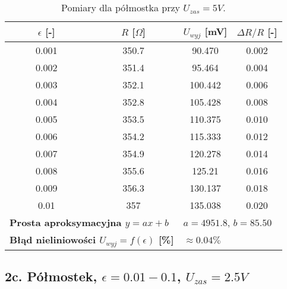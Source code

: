 \documentclass[12pt, a4paper]{article}
\begin{document}
	\begin{table}[H]
		\centering
		\caption{Pomiary dla półmostka przy $U_{zas} = 5 V$.}
		\begin{tabular}{cccc}
			\toprule
			$\epsilon$ [-] & $R$ [$\Omega$] & $U_{wyj}$ [mV] & $\Delta R/R$ [-] \\
			\midrule
			0.001 & 350.7 & 90.470 & 0.002 \\
			0.002 & 351.4 & 95.464 & 0.004 \\
			0.003 & 352.1 & 100.442 & 0.006 \\
			0.004 & 352.8 & 105.428 & 0.008 \\
			0.005 & 353.5 & 110.375 & 0.010 \\
			0.006 & 354.2 & 115.333 & 0.012 \\
			0.007 & 354.9 & 120.278 & 0.014 \\
			0.008 & 355.6 & 125.21 & 0.016 \\
			0.009 & 356.3 & 130.137 & 0.018 \\
			0.01 & 357 & 135.038 & 0.020 \\
			\midrule
			\multicolumn{2}{l}{\textbf{Prosta aproksymacyjna $y = ax + b$}} & \multicolumn{2}{l}{$a = 4951.8$, $b = 85.50$} \\
			\multicolumn{2}{l}{\textbf{Błąd nieliniowości $U_{wyj} = f(\epsilon)$ [\%]}} & \multicolumn{2}{l}{$\approx 0.04 \%$} \\
			\bottomrule
		\end{tabular}
	\end{table}
	
	\subsection{2c. Półmostek, $\epsilon = 0.01-0.1$, $U_{zas} = 2.5 V$}
	
\end{document}
